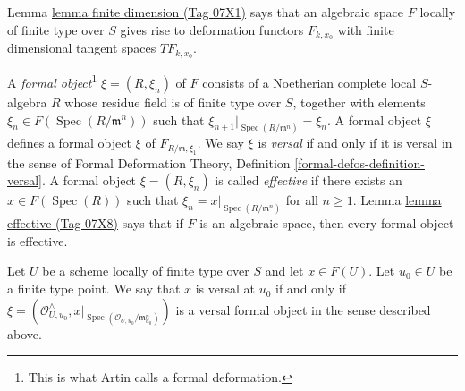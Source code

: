 \documentclass{amsart}
\theoremstyle{plain}
\theoremstyle{definition}
\theoremstyle{remark}
\numberwithin{equation}{subsection}
\def\Spec{\mathop{\mathrm{Spec}}}
\begin{document}
\medskip\noindent
Lemma \href{https://stacks.math.columbia.edu/tag/07X1}{lemma finite dimension (Tag 07X1)} says that an algebraic space $F$
locally of finite type over $S$ gives rise to deformation functors
$F_{k, x_0}$ with finite dimensional tangent spaces $TF_{k, x_0}$.

\medskip\noindent
A {\it formal object}\footnote{This is what Artin calls a formal deformation.}
$\xi = (R, \xi_n)$ of $F$ consists of a Noetherian
complete local $S$-algebra $R$ whose residue field is of finite type
over $S$, together with elements $\xi_n \in F(\Spec(R/\mathfrak m^n))$
such that $\xi_{n + 1}|_{\Spec(R/\mathfrak m^n)} = \xi_n$. A formal
object $\xi$ defines a formal object $\xi$ of $F_{R/\mathfrak m, \xi_1}$.
We say $\xi$ is {\it versal} if and only if it is versal in the sense of
Formal Deformation Theory, Definition \ref{formal-defos-definition-versal}.
A formal object $\xi = (R, \xi_n)$ is called {\it effective}
if there exists an $x \in F(\Spec(R))$ such that
$\xi_n = x|_{\Spec(R/\mathfrak m^n)}$ for all $n \geq 1$.
Lemma \href{https://stacks.math.columbia.edu/tag/07X8}{lemma effective (Tag 07X8)} says that if $F$ is an algebraic space,
then every formal object is effective.

\medskip\noindent
Let $U$ be a scheme locally of finite type over $S$ and let $x \in F(U)$.
Let $u_0 \in U$ be a finite type point. We say that $x$ is versal at $u_0$
if and only if
$\xi = (\mathcal{O}_{U, u_0}^\wedge,
x|_{\Spec(\mathcal{O}_{U, u_0}/\mathfrak m_{u_0}^n)})$
is a versal formal object in the sense described above.
\end{document}
